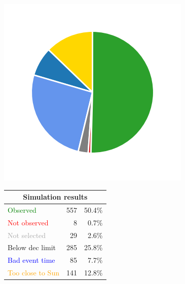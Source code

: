 \begin{colsection}
\begin{colsection}
\begin{figure}[p]
    \begin{center}
        \begin{minipage}[t]{0.2\textwidth}\vspace{10pt}
            \includegraphics[width=\linewidth]{images/gw_sims/2n8_pie.png}
        \end{minipage}
        \begin{minipage}[t]{0.37\textwidth}\vspace{0pt}
            \begin{tabular}{lrr}
                \multicolumn{3}{c}{\textbf{Simulation results}} \\
                \midrule
                \textcolor{Green}{Observed} & 557 & 50.4\% \\
                \textcolor{Red}{Not observed} & 8 & 0.7\% \\
                \textcolor{darkgray}{Not selected} & 29 & 2.6\% \\
                \textcolor{NavyBlue}{Below dec limit} & 285 & 25.8\% \\
                \textcolor{Blue}{Bad event time} & 85 & 7.7\% \\
                \textcolor{Orange}{Too close to Sun} & 141 & 12.8\% \\

\end{tabular}
\end{minipage}
\end{center}
\end{figure}
\end{colsection}
\end{colsection}
